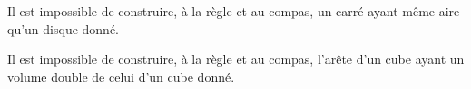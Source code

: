   \begin{application}
    Il est impossible de construire, à la règle et au compas, un carré ayant même aire qu'un disque donné.
  \end{application}

  \begin{application}
    Il est impossible de construire, à la règle et au compas, l'arête d'un cube ayant un volume double de celui d'un cube donné.
  \end{application}

